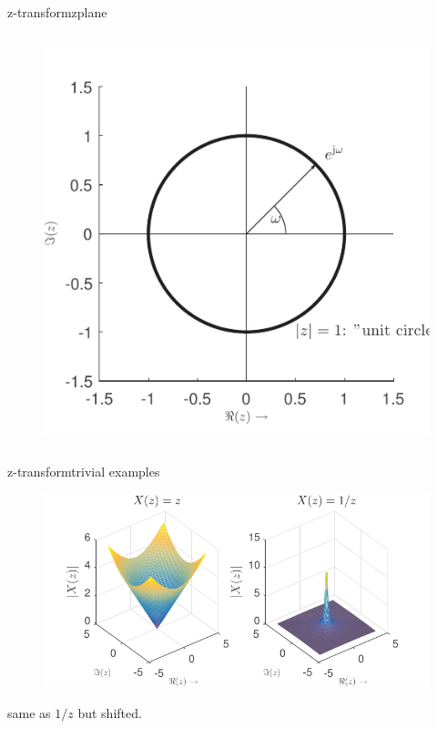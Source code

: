 \begin{frame}{z-transform}{zplane}
{\begin{columns}
\begin{figure}
                \includegraphics[width=.8\linewidth]{graph/zplane}
                \end{figure}
        \end{columns}
        }
	\end{frame}
	\begin{frame}{z-transform}{trivial examples}
        \vspace{-3mm}
        \begin{figure}
            \includegraphics[scale=.8]{graph/zplaneExamples}
        \end{figure}
        
        
        same as $1/z$ but shifted.
        
	\end{frame}
